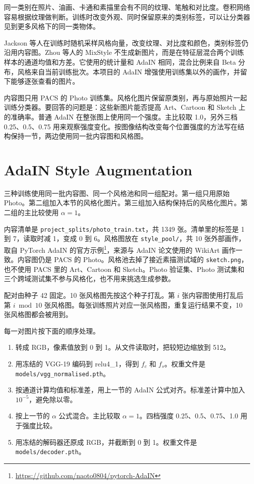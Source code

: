 \documentclass[UTF8,a4paper]{ctexart}
\begin{document}
同一类别在照片、油画、卡通和素描里会有不同的纹理、笔触和对比度。卷积网络容易根据纹理做判断\cite{geirhos2019imagenet}。训练时改变外观、同时保留原来的类别标签，可以让分类器见到更多风格下的同一类物体。

Jackson 等人在训练时随机采样风格向量，改变纹理、对比度和颜色，类别标签仍沿用内容图\cite{jackson2019style}。Zhou 等人的 MixStyle 不生成新图片，而是在特征层混合两个训练样本的通道均值和方差\cite{zhou2021mixstyle}。它使用的统计量和 AdaIN 相同，混合比例来自 Beta 分布，风格来自当前训练批次。本项目的 AdaIN 增强使用训练集以外的画作，并留下能够逐张查看的图片。

内容图只用 PACS 的 Photo 训练集\cite{li2017deeper}。风格化图片保留原类别，再与原始照片一起训练分类器。要回答的问题是：这些新图片能否提高 Art、Cartoon 和 Sketch 上的准确率。普通 AdaIN 在整张图上使用同一个强度。主比较取 1.0，另外三档 0.25、0.5、0.75 用来观察强度变化。按图像结构改变每个位置强度的方法写在结构保持一节，两边使用同一批内容图和风格图。

\section{AdaIN Style Augmentation}

三种训练使用同一批内容图、同一个风格池和同一组配对。第一组只用原始 Photo。第二组加入本节的风格化图片。第三组加入结构保持后的风格化图片。第二组的主比较使用 $\alpha=1$。

内容清单是 \texttt{project\_splits/photo\_train.txt}，共 1349 张。清单里的标签是 1 到 7，读取时减 1，变成 0 到 6。风格图放在 \texttt{style\_pool/}，共 10 张外部画作，取自 PyTorch AdaIN 的官方示例\footnote{\url{https://github.com/naoto0804/pytorch-AdaIN}}，来源与 AdaIN 论文使用的 WikiArt 画作一致\cite{huang2017adain}。内容图仍是 PACS 的 Photo。风格池去掉了接近素描测试域的 \texttt{sketch.png}，也不使用 PACS 里的 Art、Cartoon 和 Sketch。Photo 验证集、Photo 测试集和三个跨域测试集不参与风格化，也不用来挑选生成参数。

配对由种子 42 固定。10 张风格图先按这个种子打乱。第 $i$ 张内容图使用打乱后第 $i \bmod 10$ 张风格图。每张训练照片对应一张风格图，重复运行结果不变，10 张风格图都会被用到。

每一对图片按下面的顺序处理。
\begin{enumerate}
  \item 转成 RGB，像素值放到 0 到 1。从文件读取时，把较短边缩放到 512。
  \item 用冻结的 VGG-19 编码到 relu4\_1，得到 $f_c$ 和 $f_s$。权重文件是 \texttt{models/vgg\_normalised.pth}。
  \item 按通道计算均值和标准差，用上一节的 AdaIN 公式对齐。标准差计算中加入 $10^{-5}$，避免除以零。
  \item 按上一节的 $\alpha$ 公式混合。主比较取 $\alpha=1$。四档强度 0.25、0.5、0.75、1.0 用于强度比较。
  \item 用冻结的解码器还原成 RGB，并截断到 0 到 1。权重文件是 \texttt{models/decoder.pth}。
\end{enumerate}
\end{document}
